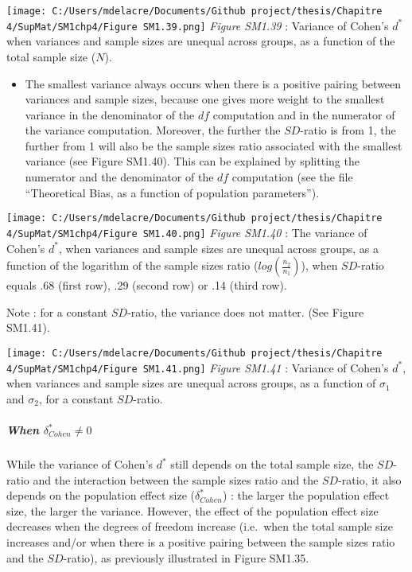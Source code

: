 \documentclass[
  english,
  man,mask,floatsintext]{apa6}
\providecommand{\tightlist}{%
  \setlength{\itemsep}{0pt}\setlength{\parskip}{0pt}}
\let\oldsubparagraph\subparagraph
\renewcommand{\subparagraph}[1]{\oldsubparagraph{#1}\mbox{}}
\begin{document}
\texttt{[image: C:/Users/mdelacre/Documents/Github project/thesis/Chapitre 4/SupMat/SM1chp4/Figure SM1.39.png]}
\emph{Figure SM1.39} : Variance of Cohen's \(d^*\) when variances and sample sizes are unequal across groups, as a function of the total sample size (\(N\)).

\begin{itemize}
\tightlist
\item
  The smallest variance always occurs when there is a positive pairing between variances and sample sizes, because one gives more weight to the smallest variance in the denominator of the \(df\) computation and in the numerator of the variance computation. Moreover, the further the \(SD\)-ratio is from 1, the further from 1 will also be the sample sizes ratio associated with the smallest variance (see Figure SM1.40). This can be explained by splitting the numerator and the denominator of the \(df\) computation (see the file ``Theoretical Bias, as a function of population parameters'').
\end{itemize}

\texttt{[image: C:/Users/mdelacre/Documents/Github project/thesis/Chapitre 4/SupMat/SM1chp4/Figure SM1.40.png]}
\emph{Figure SM1.40} : The variance of Cohen's \(d^*\), when variances and sample sizes are unequal across groups, as a function of the logarithm of the sample sizes ratio (\(log \left( \frac{n_2}{n_1} \right)\)), when \(SD\)-ratio equals .68 (first row), .29 (second row) or .14 (third row).

\newpage

Note : for a constant \(SD\)-ratio, the variance does not matter. (See Figure SM1.41).

\texttt{[image: C:/Users/mdelacre/Documents/Github project/thesis/Chapitre 4/SupMat/SM1chp4/Figure SM1.41.png]}
\emph{Figure SM1.41} : Variance of Cohen's \(d^*\), when variances and sample sizes are unequal across groups, as a function of \(\sigma_1\) and \(\sigma_2\), for a constant \(SD\)-ratio.

\hypertarget{when-delta_cohen-neq-0-2}{%
\subparagraph{\texorpdfstring{When \(\delta^*_{Cohen} \neq 0\)}{When \textbackslash delta\^{}*\_\{Cohen\} \textbackslash neq 0}}\label{when-delta_cohen-neq-0-2}}

While the variance of Cohen's \(d^*\) still depends on the total sample size, the \(SD\)-ratio and the interaction between the sample sizes ratio and the \(SD\)-ratio, it also depends on the population effect size (\(\delta^*_{Cohen}\)) : the larger the population effect size, the larger the variance. However, the effect of the population effect size decreases when the degrees of freedom increase (i.e.~when the total sample size increases and/or when there is a positive pairing between the sample sizes ratio and the \(SD\)-ratio), as previously illustrated in Figure SM1.35.
\end{document}
